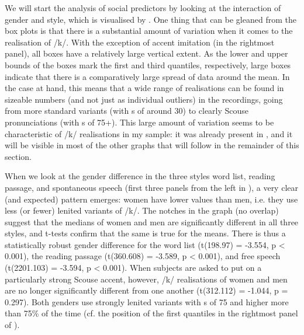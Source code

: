 We will start the analysis of social predictors by looking at the interaction of gender and style, which is visualised by .
One thing that can be gleaned from the box plots is that there is a substantial amount of variation when it comes to the realisation of /k/.
With the exception of accent imitation (in the rightmost panel), all boxes have a relatively large vertical extent.
As the lower and upper bounds of the boxes mark the first and third quantiles, respectively, large boxes indicate that there is a comparatively large spread of data around the mean.
In the case at hand, this means that a wide range of realisations can be found in sizeable numbers (and not just as individual outliers) in the recordings, going from more standard variants (with s of around 30) to clearly Scouse pronunciations (with s of 75+).
This large amount of variation seems to be characteristic of /k/ realisations in my sample: it was already present in , and it will be visible in most of the other graphs that will follow in the remainder of this section.

When we look at the gender difference in the three styles word list, reading passage, and spontaneous speech (first three panels from the left in ), a very clear (and expected) pattern emerges: women have lower  values than men, i.e. they use less (or fewer) lenited variants of /k/.
The notches in the graph (no overlap) suggest that the medians of women and men are significantly different in all three styles, and t-tests confirm that the same is true for the means.
There is thus a statistically robust gender difference for the word list (t(198.97) = -3.554, p < 0.001), the reading passage (t(360.608) = -3.589, p < 0.001), and free speech (t(2201.103) = -3.594, p < 0.001).
When subjects are asked to put on a particularly strong Scouse accent, however, /k/ realisations of women and men are no longer significantly different from one another (t(312.112) = -1.044, p = 0.297).
Both genders use strongly lenited variants with s of 75 and higher more than 75\% of the time (cf. the position of the first quantiles in the rightmost panel of ).

